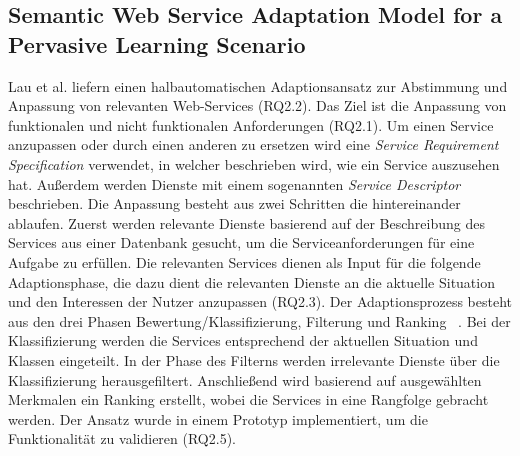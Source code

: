 \documentclass[conference,compsoc,ngerman]{IEEEtran}
\begin{document}
\subsection{Semantic Web Service Adaptation Model for a Pervasive Learning Scenario}
Lau et al.\cite{lau2008semantic} liefern einen halbautomatischen Adaptionsansatz zur Abstimmung und Anpassung von relevanten Web-Services (RQ2.2). Das Ziel ist die Anpassung von funktionalen und nicht funktionalen Anforderungen (RQ2.1). Um einen Service anzupassen oder durch einen anderen zu ersetzen wird eine \textit{Service Requirement Specification} verwendet, in welcher beschrieben wird, wie ein Service auszusehen hat. Außerdem werden Dienste mit einem sogenannten \textit{Service Descriptor} beschrieben. Die Anpassung besteht aus zwei Schritten die hintereinander ablaufen. Zuerst werden relevante Dienste basierend auf der Beschreibung des Services aus einer Datenbank gesucht, um die Serviceanforderungen für eine Aufgabe zu erfüllen. Die relevanten Services dienen als Input für die folgende Adaptionsphase, die dazu dient die relevanten Dienste an die aktuelle Situation und den Interessen der Nutzer anzupassen (RQ2.3). Der Adaptionsprozess besteht aus den drei Phasen Bewertung/Klassifizierung, Filterung und Ranking ~\cite{lau2008semantic}. Bei der Klassifizierung werden die Services entsprechend der aktuellen Situation und Klassen eingeteilt. In der Phase des Filterns werden irrelevante Dienste über die Klassifizierung herausgefiltert. Anschließend wird basierend auf ausgewählten Merkmalen ein Ranking erstellt, wobei die Services in eine Rangfolge gebracht werden.
Der Ansatz wurde in einem Prototyp implementiert, um die Funktionalität zu validieren (RQ2.5).
\end{document}
